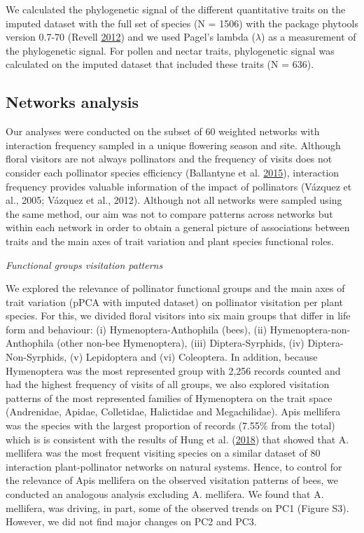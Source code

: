 \documentclass[11pt,a4paper,]{article}
\begin{document}
We calculated the phylogenetic signal of the different quantitative
traits on the imputed dataset with the full set of species (N = 1506)
with the package phytools version 0.7-70 (Revell
\protect\hyperlink{ref-revell2012}{2012}) and we used Pagel's lambda
(\(\lambda\)) as a measurement of the phylogenetic signal. For pollen
and nectar traits, phylogenetic signal was calculated on the imputed
dataset that included these traits (N = 636).

\subsection{Networks analysis}\label{networks-analysis}

Our analyses were conducted on the subset of 60 weighted networks with
interaction frequency sampled in a unique flowering season and site.
Although floral visitors are not always pollinators and the frequency of
visits does not consider each pollinator species efficiency (Ballantyne
et al. \protect\hyperlink{ref-ballantyne2015}{2015}), interaction
frequency provides valuable information of the impact of pollinators
(Vázquez et al., 2005; Vázquez et al., 2012). Although not all networks
were sampled using the same method, our aim was not to compare patterns
across networks but within each network in order to obtain a general
picture of associations between traits and the main axes of trait
variation and plant species functional roles.

\emph{Functional groups visitation patterns}

We explored the relevance of pollinator functional groups and the main
axes of trait variation (pPCA with imputed dataset) on pollinator
visitation per plant species. For this, we divided floral visitors into
six main groups that differ in life form and behaviour: (i)
Hymenoptera-Anthophila (bees), (ii) Hymenoptera-non-Anthophila (other
non-bee Hymenoptera), (iii) Diptera-Syrphids, (iv) Diptera-Non-Syrphids,
(v) Lepidoptera and (vi) Coleoptera. In addition, because Hymenoptera
was the most represented group with 2,256 records counted and had the
highest frequency of visits of all groups, we also explored visitation
patterns of the most represented families of Hymenoptera on the trait
space (Andrenidae, Apidae, Colletidae, Halictidae and Megachilidae).
Apis mellifera was the species with the largest proportion of records
(7.55\% from the total) which is is consistent with the results of Hung
et al. (\protect\hyperlink{ref-hung2018}{2018}) that showed that A.
mellifera was the most frequent visiting species on a similar dataset of
80 interaction plant-pollinator networks on natural systems. Hence, to
control for the relevance of Apis mellifera on the observed visitation
patterns of bees, we conducted an analogous analysis excluding A.
mellifera. We found that A. mellifera, was driving, in part, some of the
observed trends on PC1 (Figure S3). However, we did not find major
changes on PC2 and PC3.
\end{document}
